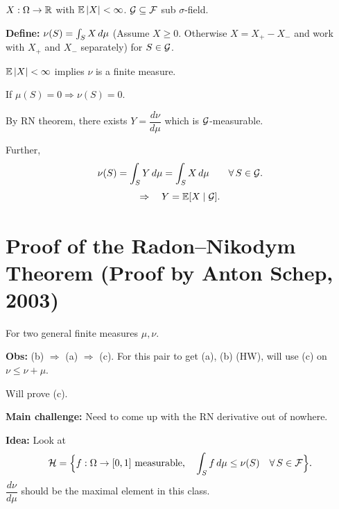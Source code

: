 $X : \Omega \to \mathbb{R}$ with $\mathbb{E}\left|X\right| < \infty$. $\mathcal{G} \subseteq \mathcal{F}$ sub $\sigma$-field.

\textbf{Define:} $\nu(S) = \int_S X \,d\mu$ (Assume $X \geq 0$. Otherwise $X = X_+ - X_-$ and work with $X_+$ and $X_-$ separately) for $S \in \mathcal{G}$.

$\mathbb{E}\left|X\right| < \infty$ implies $\nu$ is a finite measure.

If $\mu(S) = 0 \Rightarrow \nu(S) = 0$.

By RN theorem, there exists $Y = \dfrac{d\nu}{d\mu}$ which is $\mathcal{G}$-measurable.

Further,
\[
    \nu(S) = \int_S Y \,d\mu = \int_S X \,d\mu \qquad \forall\, S \in \mathcal{G}.
\]
\[
    \Rightarrow \quad Y = \mathbb{E}[X \mid \mathcal{G}].
\]

\section{Proof of the Radon--Nikodym Theorem (Proof by Anton Schep, 2003)}

For two general finite measures $\mu, \nu$.

\textbf{Obs:} (b) $\Rightarrow$ (a) $\Rightarrow$ (c). For this pair to get (a), (b) (HW), will use (c) on $\nu \leq \nu + \mu$.

Will prove (c).

\textbf{Main challenge:} Need to come up with the RN derivative out of nowhere.

\textbf{Idea:} Look at
\[
    \mathcal{H} = \Bigl\{ f : \Omega \to [0,1] \text{ measurable}, \quad \int_S f \,d\mu \leq \nu(S) \quad \forall\, S \in \mathcal{F} \Bigr\}.
\]
$\dfrac{d\nu}{d\mu}$ should be the maximal element in this class.

